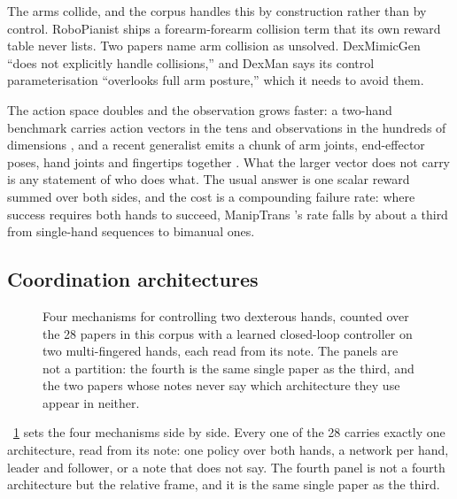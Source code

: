 The arms collide, and the corpus handles this by construction rather than by control. RoboPianist
\cite{robopianist_2023} ships a forearm-forearm collision term that its own reward table never
lists. Two papers name arm collision as unsolved. DexMimicGen \cite{dexmimicgen_2024} ``does not
explicitly handle collisions,'' and DexMan \cite{dexman_2025} says its control parameterisation
``overlooks full arm posture,'' which it needs to avoid them.

The action space doubles and the observation grows faster: a two-hand benchmark carries action
vectors in the tens and observations in the hundreds of dimensions \cite{bidexhands_2022}, and a
recent generalist emits a chunk of arm joints, end-effector poses, hand joints and fingertips
together \cite{gr_dexter_2025}. What the larger vector does not carry is any statement of who does
what. The usual answer is one scalar reward summed over both sides, and the cost is a compounding
failure rate: where success requires both hands to succeed, ManipTrans
\cite{maniptrans_2025}'s rate falls by about a third from single-hand sequences to bimanual
ones.

\subsection{Coordination architectures}
\label{subsec:coordination}

\begin{figure}[!t]
\centering
{}
\caption{Four mechanisms for controlling two dexterous hands, counted over the 28 papers in this corpus with
a learned closed-loop controller on two multi-fingered hands, each read from its note. The panels
are not a partition: the fourth is the same single paper as the third, and the two papers whose notes
never say which architecture they use appear in neither.}
\label{fig:bimanual}
\end{figure}

\figurename~\ref{fig:bimanual} sets the four mechanisms side by side. Every one of the 28 carries
exactly one architecture, read from its note: one policy over both hands, a network per hand,
leader and follower, or a note that does not say. The fourth panel is not a fourth architecture but
the relative frame, and it is the same single paper as the third.

